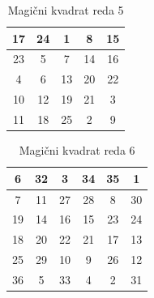 \documentclass[a4paper,12pt]{article}
\newenvironment{magic}[3]
{
   \begin{table}[!ht]
   \centering
   \caption{#2}
   \label{#3}
   \large
   \begin{tabular}{|*{#1}{c|}}
   \hline
}
{
   \end{tabular}
   \normalsize
\end{table}
}
\theoremstyle{definition}
\theoremstyle{plain}
\begin{document}
\begin{magic}{5}{Magični kvadrat reda 5}{table:mag5}
17 & 24 & 1 & 8 & 15 \\ \hline
23 & 5 & 7 & 14 & 16 \\ \hline
4 & 6 & 13 & 20 & 22 \\ \hline
10 & 12 & 19 & 21 & 3 \\ \hline
11 & 18 & 25 & 2 & 9 \\ \hline
\end{magic}

\begin{magic}{6}{Magični kvadrat reda 6}{table:mag6}
6 & 32 & 3 & 34 & 35 & 1 \\ \hline
7 & 11 & 27 & 28 & 8 & 30 \\ \hline
19 & 14 & 16 & 15 & 23 & 24 \\ \hline
18 & 20 & 22 & 21 & 17 & 13 \\ \hline
25 & 29 & 10 & 9 & 26 & 12 \\ \hline
36 & 5 & 33 & 4 & 2 & 31 \\ \hline
\end{magic}
\end{document}
